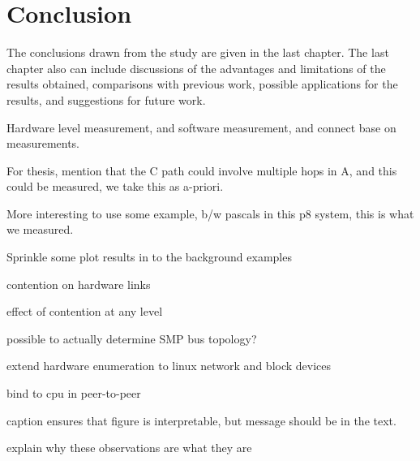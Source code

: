 \chapter{Conclusion}
\label{ch:conclusion}

The conclusions drawn from the study are given in the last chapter.
The last chapter also can include discussions of the advantages and limitations of the results obtained, comparisons with previous work, possible applications for the results, and suggestions for future work.



Hardware level measurement, and software measurement, and connect base on measurements.

For thesis, mention that the C path could involve multiple hops in A, and this could be measured, we take this as a-priori.

More interesting to use some example, b/w pascals in this p8 system, this is what we measured.

Sprinkle some plot results in to the background examples

contention on hardware links

effect of contention at any level

possible to actually determine SMP bus topology?

extend hardware enumeration to linux network and block devices

bind to cpu in peer-to-peer

caption ensures that figure is interpretable, but message should be in the text.

explain why these observations are what they are
